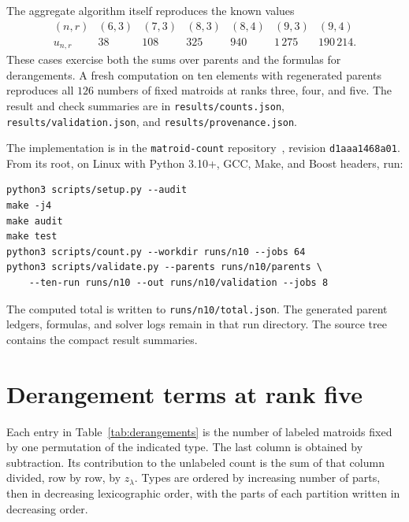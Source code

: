 \documentclass[11pt]{article}
\theoremstyle{definition}
\newcounter{algorithm}
\begin{document}
The aggregate algorithm itself reproduces the known values
\[
\begin{array}{c|rrrrrr}
(n,r)&(6,3)&(7,3)&(8,3)&(8,4)&(9,3)&(9,4)\\ \hline
u_{n,r}&38&108&325&940&1\,275&190\,214.
\end{array}
\]
These cases exercise both the sums over parents and the formulas for
derangements. A fresh computation on ten elements with regenerated parents
reproduces all $126$ numbers of fixed matroids at ranks three, four, and
five. The result and check
summaries are in \texttt{results/counts.json},
\texttt{results/validation.json}, and \texttt{results/provenance.json}.

\noindent\begin{minipage}{\linewidth}
The implementation is in the \texttt{matroid-count} repository~\cite{Code},
revision \texttt{d1aaa1468a01}. From its root, on Linux with Python 3.10+,
GCC, Make, and Boost headers, run:
\begin{verbatim}
python3 scripts/setup.py --audit
make -j4
make audit
make test
python3 scripts/count.py --workdir runs/n10 --jobs 64
python3 scripts/validate.py --parents runs/n10/parents \
    --ten-run runs/n10 --out runs/n10/validation --jobs 8
\end{verbatim}
\end{minipage}
\par\smallskip
The computed total is written to \texttt{runs/n10/total.json}.
The generated parent ledgers, formulas, and solver logs remain in that
run directory. The source tree contains the compact result summaries.

\appendix
\section{Derangement terms at rank five}\label{app:derangements}

Each entry in Table~\ref{tab:derangements} is the number of labeled matroids
fixed by one permutation of the indicated type. The last column is obtained
by subtraction. Its contribution to the unlabeled count is the sum of that
column divided, row by row, by $z_\lambda$. Types are ordered by increasing
number of parts, then in decreasing lexicographic order, with the parts of
each partition written in decreasing order.
\end{document}

